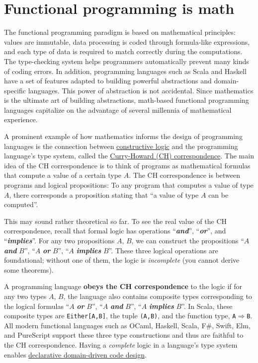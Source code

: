 \section{Functional programming is math}

The functional programming paradigm is based on mathematical principles:
values are immutable, data processing is coded through formula-like
expressions, and each type of data is required to match correctly
during the computations. The type-checking system helps programmers
automatically prevent many kinds of coding errors. In addition, programming
languages such as Scala and Haskell have a set of features adapted
to building powerful abstractions and domain-specific languages. This
power of abstraction is not accidental. Since mathematics is the ultimate
art of building abstractions, math-based functional programming languages
capitalize on the advantage of several millennia of mathematical experience.

A prominent example of how mathematics informs the design of programming
languages is the connection between \href{https://en.wikipedia.org/wiki/Intuitionistic_logic}{constructive logic}
and the programming language's type system, called the \href{https://en.wikipedia.org/wiki/Curry\%E2\%80\%93Howard_correspondence}{Curry-Howard (CH) correspondence}.
The main idea of the CH correspondence
is to think of programs as mathematical formulas that compute a value
of a certain type $A$. The CH correspondence is between programs
and logical propositions: To any program that computes a value of
type $A$, there corresponds a proposition stating that ``a value
of type $A$ can be computed''.

This may sound rather theoretical so far. To see the real value of
the CH correspondence, recall that formal logic has operations ``\textbf{\emph{and}}'',
``\textbf{\emph{or}}'', and ``\textbf{\emph{implies}}''. For any
two propositions $A$, $B$, we can construct the propositions ``$A$
\textbf{\emph{and}} $B$'', ``$A$ \textbf{\emph{or}} $B$'', ``$A$
\textbf{\emph{implies}} $B$''. These three logical operations are
foundational; without one of them, the logic is \emph{incomplete}
(you cannot derive some theorems).

A programming language \textbf{obeys the CH correspondence}
to the logic if for any two types $A$, $B$, the language also contains
composite types corresponding to the logical formulas ``$A$ \textbf{\emph{or}}
$B$'', ``$A$ \textbf{\emph{and}} $B$'', ``$A$ \textbf{\emph{implies}}
$B$''. In Scala, these composite types are \texttt{Either{[}A,B{]}},
the tuple \texttt{(A,B)}, and the function type, \texttt{A$\Rightarrow$B}.
All modern functional languages such as OCaml, Haskell, Scala, F\#,
Swift, Elm, and PureScript support these three type constructions
and thus are faithful to the CH correspondence. Having a \emph{complete}
logic in a language's type system enables \href{https://fsharpforfunandprofit.com/ddd/}{declarative domain-driven code design}.


